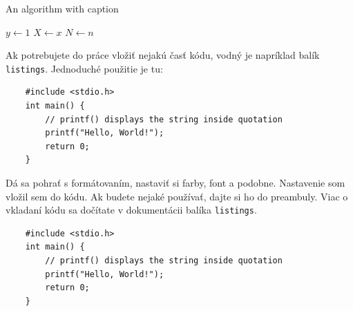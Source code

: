 \begin{algorithm}[!h]
	\caption{An algorithm with caption}\label{alg:algorithm2e_exmp}
	$y \gets 1$\;
	$X \gets x$\;
	$N \gets n$\;
\end{algorithm}

Ak potrebujete do práce vložiť nejakú časť kódu, vodný je napríklad balík \verb|listings|. Jednoduché použitie je tu:
\begin{lstlisting}
	#include <stdio.h>
	int main() {
		// printf() displays the string inside quotation
		printf("Hello, World!");
		return 0;
	}
\end{lstlisting}

Dá sa pohrať s formátovaním, nastaviť si farby, font a podobne. Nastavenie som vložil sem do kódu. Ak budete nejaké používať, dajte si ho do preambuly. Viac o vkladaní kódu sa dočítate v dokumentácii balíka \verb|listings|.



\begin{lstlisting}
	#include <stdio.h>
	int main() {
		// printf() displays the string inside quotation
		printf("Hello, World!");
		return 0;
	}
\end{lstlisting}
